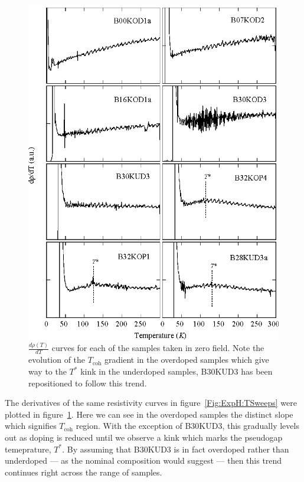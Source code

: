 \begin{figure}[htbp]
    \begin{center}
        \includegraphics[scale=0.9]{Chapter-HallBSCO/Figures/DRhoDtCurves/DRhoDtCurves}
        \caption{$\frac{d\rho(T)}{dT}$ curves for each of the samples taken in zero field. Note the evolution of the $T_{\textrm{coh}}$ gradient in the overdoped samples which give way to the $T^*$ kink in the underdoped samples, B30KUD3 has been repositioned to follow this trend.}
        \label{Fig:ExpH:DRhoDtCurves}
    \end{center}
\end{figure}
The derivatives of the same resistivity curves in figure~\ref{Fig:ExpH:TSweeps} were plotted in figure~\ref{Fig:ExpH:DRhoDtCurves}. Here we can see in the overdoped samples the distinct slope which signifies $T_{\textrm{coh}}$ region. With the exception of B30KUD3, this gradually levels out as doping is reduced until we observe a kink which marks the pseudogap temeprature, $T^*$. By assuming that B30KUD3 is in fact overdoped rather than underdoped --- as the nominal composition would suggest --- then this trend continues right across the range of samples.

